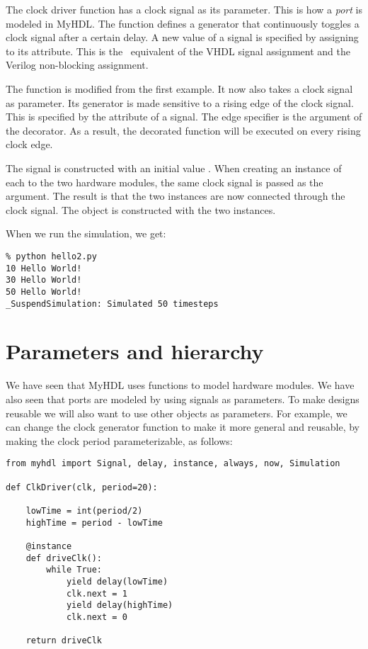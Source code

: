 The clock driver function  has a
clock signal as its parameter. This is how a
\emph{port} is modeled in MyHDL. The function
defines a generator
that continuously toggles a clock signal after a certain delay.
A new value of a signal is specified by assigning to its
 attribute. This is the \myhdl\ equivalent of 
the VHDL signal assignment and the 
Verilog non-blocking assignment.

The  function is modified from the
first example. It now also takes a clock signal as parameter.
Its generator is made sensitive to a rising
edge of the clock signal. This is specified by the
 attribute of a signal. The edge
specifier is the argument of the 
decorator. As a result, the decorated function
will be executed on every rising clock edge.

The  signal is constructed with an initial value
. When creating an instance of each to the two
hardware modules, the same clock signal is passed as
the argument. The result is that the two instances
are now connected through the clock signal.
The  object is constructed with the
two instances.

When we run the simulation, we get:

\begin{verbatim}
% python hello2.py
10 Hello World!
30 Hello World!
50 Hello World!
_SuspendSimulation: Simulated 50 timesteps
\end{verbatim}


\section{Parameters and hierarchy \label{intro-hier}}

We have seen that MyHDL uses functions to model hardware
modules. We have also seen that ports are modeled by using
signals as parameters. To make designs reusable we will also
want to use other objects as parameters. For example, we can
change the clock generator function to make it more general
and reusable, by making the clock period parameterizable, as
follows:

\begin{verbatim}
from myhdl import Signal, delay, instance, always, now, Simulation

def ClkDriver(clk, period=20):
    
    lowTime = int(period/2)
    highTime = period - lowTime

    @instance
    def driveClk():
        while True:
            yield delay(lowTime)
            clk.next = 1
            yield delay(highTime)
            clk.next = 0

    return driveClk
\end{verbatim}

